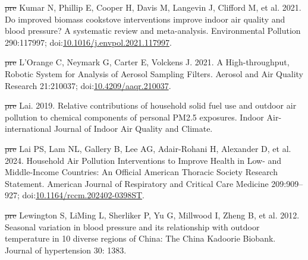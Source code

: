 \documentclass[
  letterpaper,
  DIV=11,
  numbers=noendperiod]{scrartcl}
\newlength{\cslhangindent}
\newenvironment{CSLReferences}[2] %
 {\begin{list}{}{%
  \setlength{\itemindent}{0pt} %
  \setlength{\leftmargin}{0pt} %
  \setlength{\parsep}{0pt} %
  \ifodd #1
   \setlength{\leftmargin}{\cslhangindent} %
   \setlength{\itemindent}{-1\cslhangindent} %
  \fi
  \setlength{\itemsep}{#2\baselineskip}}} %
 {\end{list}} %
\providecommand{\DIFdeltex}[1]{{\protect\color{red}\sout{#1}}}                      %
\providecommand{\DIFaddbegin}{} %
\providecommand{\DIFaddend}{} %
\providecommand{\DIFdelbegin}{} %
\providecommand{\DIFdelend}{} %
\providecommand{\DIFdel}[1]{\texorpdfstring{\DIFdeltex{#1}}{}} %
\newcommand{\DIFscaledelfig}{0.5}
\newlength{\DIFdelgraphicswidth} %
\newlength{\DIFdelgraphicsheight} %
\newcommand{\DIFaddincludegraphics}[2][]{{\color{blue}\fbox{\DIFOincludegraphics[#1]{#2}}}} %
\newcommand{\DIFdelincludegraphics}[2][]{%
\sbox{\DIFdelgraphicsbox}{\DIFOincludegraphics[#1]{#2}}%
\settoboxwidth{\DIFdelgraphicswidth}{\DIFdelgraphicsbox} %
\settoboxtotalheight{\DIFdelgraphicsheight}{\DIFdelgraphicsbox} %
\scalebox{\DIFscaledelfig}{%
\parbox[b]{\DIFdelgraphicswidth}{\usebox{\DIFdelgraphicsbox}\\[-\baselineskip] \rule{\DIFdelgraphicswidth}{0em}}\llap{\resizebox{\DIFdelgraphicswidth}{\DIFdelgraphicsheight}{%
\setlength{\unitlength}{\DIFdelgraphicswidth}%
\begin{picture}(1,1)%
\thicklines\linethickness{2pt} %
{\color[rgb]{1,0,0}\put(0,0){\framebox(1,1){}}}%
{\color[rgb]{1,0,0}\put(0,0){\line( 1,1){1}}}%
{\color[rgb]{1,0,0}\put(0,1){\line(1,-1){1}}}%
\end{picture}%
}\hspace*{3pt}}} %
} %
\DeclareRobustCommand{\DIFaddbegin}{\DIFOaddbegin \let\includegraphics\DIFaddincludegraphics} %
\DeclareRobustCommand{\DIFaddend}{\DIFOaddend \let\includegraphics\DIFOincludegraphics} %
\DeclareRobustCommand{\DIFdelbegin}{\DIFOdelbegin \let\includegraphics\DIFdelincludegraphics} %
\DeclareRobustCommand{\DIFdelend}{\DIFOaddend \let\includegraphics\DIFOincludegraphics} %
\begin{document}
\begin{CSLReferences}{1}{1}
\DIFdelbegin %
\DIFdel{pre}%
\DIFdelend \DIFaddbegin {}
\DIFaddend Kumar N, Phillip E, Cooper H, Davis M, Langevin J, Clifford M, et al.
2021. Do improved biomass cookstove interventions improve indoor air
quality and blood pressure? {A} systematic review and meta-analysis.
Environmental Pollution 290:117997;
doi:\href{https://doi.org/10.1016/j.envpol.2021.117997}{10.1016/j.envpol.2021.117997}.

\DIFdelbegin %
\DIFdel{pre}%
\DIFdelend \DIFaddbegin {}
\DIFaddend L'Orange C, Neymark G, Carter E, Volckens J. 2021. A {High-throughput},
{Robotic System} for {Analysis} of {Aerosol Sampling Filters}. Aerosol
and Air Quality Research 21:210037;
doi:\href{https://doi.org/10.4209/aaqr.210037}{10.4209/aaqr.210037}.

\DIFdelbegin %
\DIFdel{pre}%
\DIFdelend \DIFaddbegin {}
\DIFaddend Lai. 2019. Relative contributions of household solid fuel use and
outdoor air pollution to chemical components of personal {PM2}.5
exposures. Indoor Air-international Journal of Indoor Air Quality and
Climate.

\DIFdelbegin %
\DIFdel{pre}%
\DIFdelend \DIFaddbegin {}
\DIFaddend Lai PS, Lam NL, Gallery B, Lee AG, Adair-Rohani H, Alexander D, et al.
2024. Household {Air Pollution Interventions} to {Improve Health} in
{Low-} and {Middle-Income Countries}: {An Official American Thoracic
Society Research Statement}. American Journal of Respiratory and
Critical Care Medicine 209:909--927;
doi:\href{https://doi.org/10.1164/rccm.202402-0398ST}{10.1164/rccm.202402-0398ST}.

\DIFdelbegin %
\DIFdel{pre}%
\DIFdelend \DIFaddbegin {}
\DIFaddend Lewington S, LiMing L, Sherliker P, Yu G, Millwood I, Zheng B, et al.
2012. Seasonal variation in blood pressure and its relationship with
outdoor temperature in 10 diverse regions of {China}: The {China
Kadoorie Biobank}. Journal of hypertension 30: 1383.


\end{CSLReferences}
\end{document}
